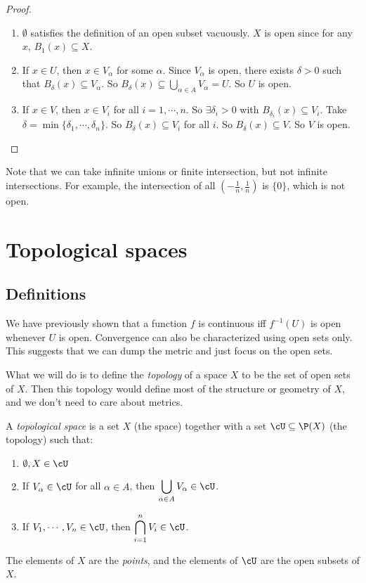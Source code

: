 \documentclass[a4paper]{article}
\begin{document}
\begin{proof}\leavevmode
  \begin{enumerate}
    \item $\emptyset$ satisfies the definition of an open subset vacuously. $X$ is open since for any $x$, $B_1(x) \subseteq X$.
    \item If $x\in U$, then $x\in V_\alpha$ for some $\alpha$. Since $V_\alpha$ is open, there exists $\delta > 0$ such that $B_\delta(x) \subseteq V_\alpha$. So $\displaystyle B_\delta (x) \subseteq \bigcup_{\alpha \in A}V_\alpha = U$. So $U$ is open.
    \item If $x\in V$, then $x\in V_i$ for all $i = 1, \cdots, n$. So $\exists \delta_i > 0$ with $B_{\delta_i}(x) \subseteq V_i$. Take $\delta = \min\{\delta_1, \cdots, \delta_n\}$. So $B_\delta(x) \subseteq V_i$ for all $i$. So $B_\delta(x) \subseteq V$. So $V$ is open.
  \end{enumerate}
\end{proof}
Note that we can take infinite unions or finite intersection, but not infinite intersections. For example, the intersection of all $(-\frac{1}{n}, \frac{1}{n})$ is $\{0\}$, which is not open.

\section{Topological spaces}
\subsection{Definitions}
We have previously shown that a function $f$ is continuous iff $f^{-1}(U)$ is open whenever $U$ is open. Convergence can also be characterized using open sets only. This suggests that we can dump the metric and just focus on the open sets.

What we will do is to define the \emph{topology} of a space $X$ to be the set of open sets of $X$. Then this topology would define most of the structure or geometry of $X$, and we don't need to care about metrics.

\begin{defi}
  A \emph{topological space} is a set $X$ (the space) together with a set $\cU \subseteq \P(X)$ (the topology) such that:
  \begin{enumerate}
    \item $\emptyset, X\in \cU$
    \item If $V_\alpha\in \cU$ for all $\alpha \in A$, then $\displaystyle \bigcup_{\alpha\in A}V_\alpha \in \cU$.
    \item If $V_1, \cdots, V_n \in \cU$, then $\displaystyle \bigcap_{i = 1}^n V_i \in \cU$.
  \end{enumerate}
  The elements of $X$ are the \emph{points}, and the elements of $\cU$ are the open subsets of $X$.
\end{defi}
\end{document}
